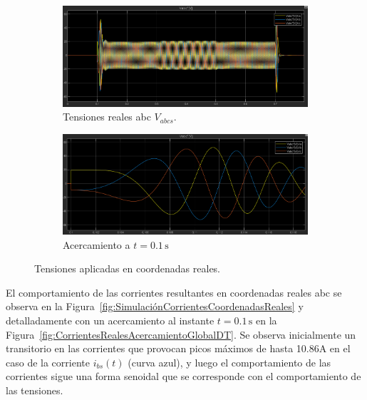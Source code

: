 \documentclass{article}
\begin{document}
\begin{figure}[H]
    \centering
    \begin{subfigure}[b]{0.45\textwidth}
        \centering
        \includegraphics[width=\textwidth]{Imagenes/ConsignasTensionABC.png}
        \caption{Tensiones reales abc \(V_{abcs}\).}
        \label{fig:TensionesRealesGlobalDT}
    \end{subfigure}
    \hfill
    \begin{subfigure}[b]{0.45\textwidth}
        \centering
        \includegraphics[width=\textwidth]{Imagenes/ConsignasTensionABCacercamiento.png}
        \caption{Acercamiento a $t = 0{.}1\,\text{s}$}
        \label{fig:TensionesRealesAcercamientoGlobalDT}
    \end{subfigure}
    \caption{Tensiones aplicadas en coordenadas reales.}
    \label{fig:SimulaciónTensionesCoordenadasReales}
\end{figure}
El comportamiento de las corrientes resultantes en coordenadas reales abc se observa en la Figura~\ref{fig:SimulaciónCorrientesCoordenadasReales} y detalladamente con un acercamiento al instante $t = 0{.}1\,\text{s}$ en la Figura~\ref{fig:CorrientesRealesAcercamientoGlobalDT}. Se observa inicialmente un transitorio en las corrientes que provocan picos máximos de hasta 10.86A en el caso de la corriente \(i_{bs}(t)\) (curva azul), y luego el comportamiento de las corrientes sigue una forma senoidal que se corresponde con el comportamiento de las tensiones. 
\end{document}

